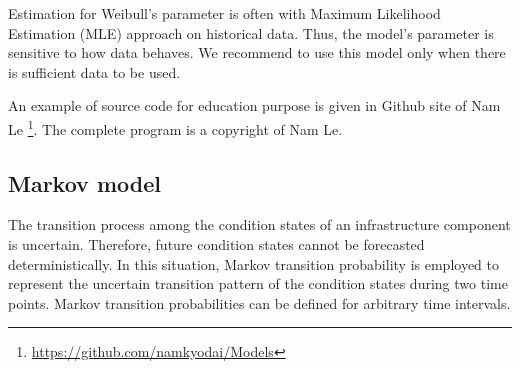 Estimation for Weibull's parameter is often with Maximum Likelihood Estimation (MLE) approach on historical data. Thus, the model's parameter is sensitive to how data behaves. We recommend to use this model only when there is sufficient data to be used.

An example of source code for education purpose is given in Github site of Nam Le \footnote{\href{https://github.com/namkyodai/Models}{https://github.com/namkyodai/Models}}. The complete program is a copyright of Nam Le. 

\subsection{Markov model}
\label{232}
The transition process among the condition states of an infrastructure component is uncertain. Therefore, future condition states cannot be forecasted deterministically. In this situation, Markov transition probability is employed to represent the uncertain transition pattern of the condition states during two time points. Markov transition probabilities can be defined for arbitrary time intervals. 

